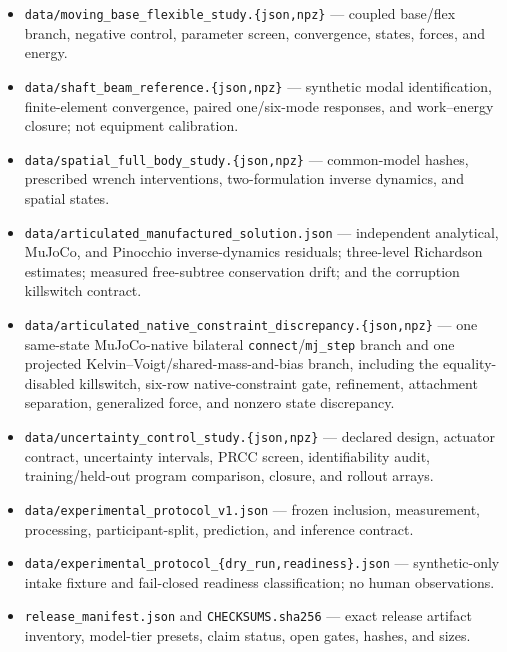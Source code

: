 \documentclass[
  letterpaper,
]{report}
\begin{document}
\begin{itemize}
  \texttt{data/forward\_two\_arm\_study.npz} --- baseline and
  representative branch states, contact forces, force modes, moments,
  power, energy, and solver residuals.
\item
  \texttt{data/moving\_base\_flexible\_study.\{json,npz\}} --- coupled
  base/flex branch, negative control, parameter screen, convergence,
  states, forces, and energy.
\item
  \texttt{data/shaft\_beam\_reference.\{json,npz\}} --- synthetic modal
  identification, finite-element convergence, paired one/six-mode
  responses, and work--energy closure; not equipment calibration.
\item
  \texttt{data/spatial\_full\_body\_study.\{json,npz\}} --- common-model
  hashes, prescribed wrench interventions, two-formulation inverse
  dynamics, and spatial states.
\item
  \texttt{data/articulated\_manufactured\_solution.json} --- independent
  analytical, MuJoCo, and Pinocchio inverse-dynamics residuals;
  three-level Richardson estimates; measured free-subtree conservation
  drift; and the corruption killswitch contract.
\item
  \texttt{data/articulated\_native\_constraint\_discrepancy.\{json,npz\}}
  --- one same-state MuJoCo-native bilateral
  \texttt{connect}/\texttt{mj\_step} branch and one projected
  Kelvin--Voigt/shared-mass-and-bias branch, including the
  equality-disabled killswitch, six-row native-constraint gate,
  refinement, attachment separation, generalized force, and nonzero
  state discrepancy.
\item
  \texttt{data/uncertainty\_control\_study.\{json,npz\}} --- declared
  design, actuator contract, uncertainty intervals, PRCC screen,
  identifiability audit, training/held-out program comparison, closure,
  and rollout arrays.
\item
  \texttt{data/experimental\_protocol\_v1.json} --- frozen inclusion,
  measurement, processing, participant-split, prediction, and inference
  contract.
\item
  \texttt{data/experimental\_protocol\_\{dry\_run,readiness\}.json} ---
  synthetic-only intake fixture and fail-closed readiness
  classification; no human observations.
\item
  \texttt{release\_manifest.json} and \texttt{CHECKSUMS.sha256} ---
  exact release artifact inventory, model-tier presets, claim status,
  open gates, hashes, and sizes.
\end{itemize}
\end{document}
